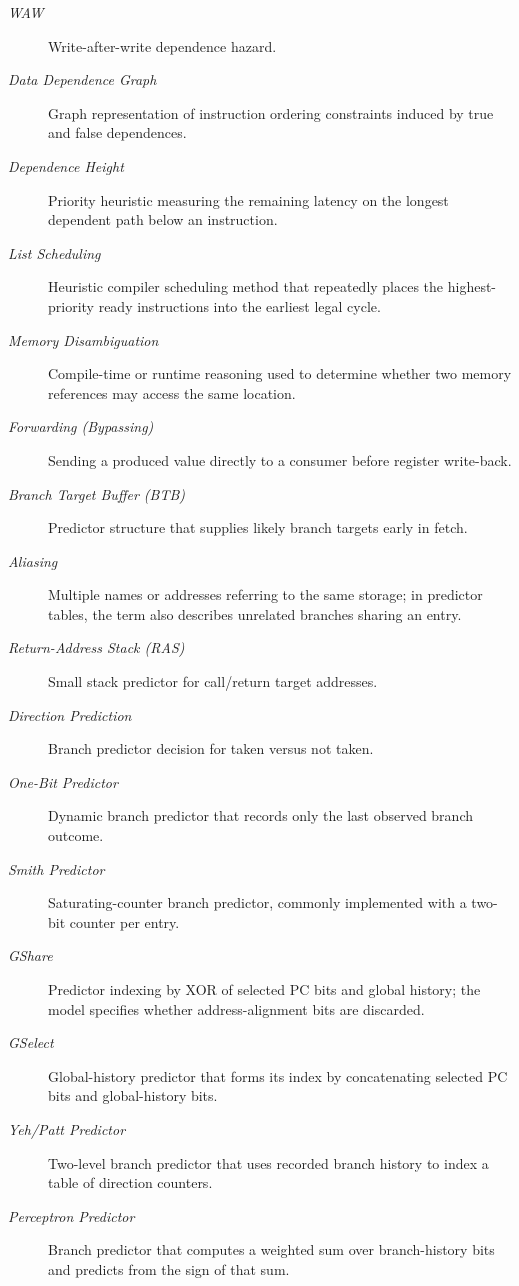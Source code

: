 \begin{description}
    \item[\textit{WAW}] Write-after-write dependence hazard.
    \item[\textit{Data Dependence Graph}] Graph representation of instruction ordering constraints induced by true and false dependences.
    \item[\textit{Dependence Height}] Priority heuristic measuring the remaining latency on the longest dependent path below an instruction.
    \item[\textit{List Scheduling}] Heuristic compiler scheduling method that repeatedly places the highest-priority ready instructions into the earliest legal cycle.
    \item[\textit{Memory Disambiguation}] Compile-time or runtime reasoning used to determine whether two memory references may access the same location.
    \item[\textit{Forwarding (Bypassing)}] Sending a produced value directly to a consumer before register write-back.
    \item[\textit{Branch Target Buffer (BTB)}] Predictor structure that supplies likely branch targets early in fetch.
    \item[\textit{Aliasing}] Multiple names or addresses referring to the same storage; in predictor tables, the term also describes unrelated branches sharing an entry.
    \item[\textit{Return-Address Stack (RAS)}] Small stack predictor for call/return target addresses.
    \item[\textit{Direction Prediction}] Branch predictor decision for taken versus not taken.
    \item[\textit{One-Bit Predictor}] Dynamic branch predictor that records only the last observed branch outcome.
    \item[\textit{Smith Predictor}] Saturating-counter branch predictor, commonly implemented with a two-bit counter per entry.
    \item[\textit{GShare}] Predictor indexing by XOR of selected PC bits and global history; the model specifies whether address-alignment bits are discarded.
    \item[\textit{GSelect}] Global-history predictor that forms its index by concatenating selected PC bits and global-history bits.
    \item[\textit{Yeh/Patt Predictor}] Two-level branch predictor that uses recorded branch history to index a table of direction counters.
    \item[\textit{Perceptron Predictor}] Branch predictor that computes a weighted sum over branch-history bits and predicts from the sign of that sum.

\end{description}
